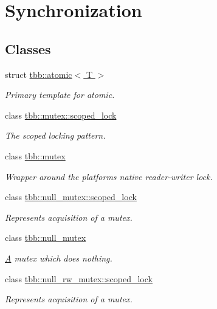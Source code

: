 \hypertarget{group__synchronization}{}\section{Synchronization}
\label{group__synchronization}
\subsection*{Classes}
\begin{DoxyCompactItemize}
\item 
struct \hyperlink{structtbb_1_1atomic}{tbb\+::atomic$<$ T $>$}
\begin{DoxyCompactList}\small\item\em Primary template for atomic. \end{DoxyCompactList}\item 
class \hyperlink{classtbb_1_1mutex_1_1scoped__lock}{tbb\+::mutex\+::scoped\+\_\+lock}
\begin{DoxyCompactList}\small\item\em The scoped locking pattern. \end{DoxyCompactList}\item 
class \hyperlink{classtbb_1_1mutex}{tbb\+::mutex}
\begin{DoxyCompactList}\small\item\em Wrapper around the platform\textquotesingle{}s native reader-\/writer lock. \end{DoxyCompactList}\item 
class \hyperlink{classtbb_1_1null__mutex_1_1scoped__lock}{tbb\+::null\+\_\+mutex\+::scoped\+\_\+lock}
\begin{DoxyCompactList}\small\item\em Represents acquisition of a mutex. \end{DoxyCompactList}\item 
class \hyperlink{classtbb_1_1null__mutex}{tbb\+::null\+\_\+mutex}
\begin{DoxyCompactList}\small\item\em \hyperlink{structA}{A} mutex which does nothing. \end{DoxyCompactList}\item 
class \hyperlink{classtbb_1_1null__rw__mutex_1_1scoped__lock}{tbb\+::null\+\_\+rw\+\_\+mutex\+::scoped\+\_\+lock}
\begin{DoxyCompactList}\small\item\em Represents acquisition of a mutex. \end{DoxyCompactList}\item 

\end{DoxyCompactItemize}
